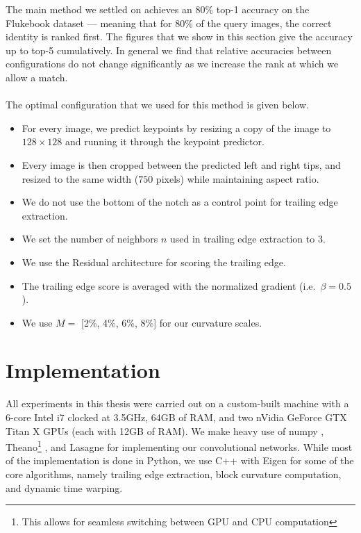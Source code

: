 The main method we settled on achieves an 80\% top-1 accuracy on the Flukebook dataset --- meaning that for 80\% of the query images, the correct identity is ranked first. 
The figures that we show in this section give the accuracy up to top-5 cumulatively.
In general we find that relative accuracies between configurations do not change significantly as we increase the rank at which we allow a match.
\\\\
The optimal configuration that we used for this method is given below.
\begin{itemize}
\item For every image, we predict keypoints by resizing a copy of the image to $128 \times 128$ and running it through the keypoint predictor.
\item Every image is then cropped between the predicted left and right tips, and resized to the same width ($750$ pixels) while maintaining aspect ratio. 
\item We do not use the bottom of the notch as a control point for trailing edge extraction.
\item We set the number of neighbors $n$ used in trailing edge extraction to $3$.
\item We use the Residual architecture for scoring the trailing edge.
\item The trailing edge score is averaged with the normalized gradient (i.e.\ $\beta = 0.5$).
\item We use $M =$ [2\%, 4\%, 6\%, 8\%] for our curvature scales.
\end{itemize}


\section{Implementation}

All experiments in this thesis were carried out on a custom-built machine with a 6-core Intel i7 clocked at 3.5GHz, 64GB of RAM, and two nVidia GeForce GTX Titan X GPUs (each with 12GB of RAM). 
We make heavy use of numpy \cite{van2011numpy}, Theano\footnote{This allows for seamless switching between GPU and CPU computation} \cite{bergstra+al:2010-scipy, Bastien-Theano-2012}, and Lasagne \cite{sander_dieleman_2015_27878} for implementing our convolutional networks.
While most of the implementation is done in Python, we use C++ with Eigen \cite{eigenweb} for some of the core algorithms, namely trailing edge extraction, block curvature computation, and dynamic time warping.  

